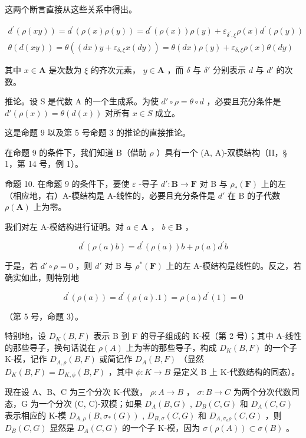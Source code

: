 这两个断言直接从这些关系中得出。

\[
\begin{array}{l} d ^ {\prime} (\rho (x y)) = d ^ {\prime} (\rho (x) \rho (y)) = d ^ {\prime} (\rho (x)) \rho (y) + \varepsilon_ {\delta ^ {\prime}, \xi} \rho (x) d ^ {\prime} (\rho (y)) \\ \theta (d (x y)) = \theta ((d x) y + \varepsilon_ {\delta, \xi} x (d y)) = \theta (d x) \rho (y) + \varepsilon_ {\delta, \xi} \rho (x) \theta (d y) \end{array}
\]

其中 \(x \in \mathbf{A}\) 是次数为 \(\xi\) 的齐次元素， \(y \in \mathbf{A}\) ，而 \(\delta\) 与 \(\delta'\) 分别表示 \(d\) 与 \(d'\) 的次数。

推论。设 S 是代数 A 的一个生成系。为使 \(d' \circ \rho = \theta \circ d\) ，必要且充分条件是 \(d'(\rho(x)) = \theta(d(x))\) 对所有 \(x \in S\) 成立。

这是命题 9 以及第 5 号命题 3 的推论的直接推论。

在命题 9 的条件下，我们知道 B（借助 \(\rho\) ）具有一个 (A, A)-双模结构（II，§ 1，第 14 号，例 1）。

命题 10. 在命题 9 的条件下，要使 \(\varepsilon\) -导子 \(d': \mathbf{B} \to \mathbf{F}\) 对 B 与 \(\rho_*(\mathbf{F})\) 上的左（相应地，右）A-模结构是 A-线性的，必要且充分条件是 \(d'\) 在 B 的子代数 \(\rho(\mathbf{A})\) 上为零。

我们对左 A-模结构进行证明。对 \(a \in \mathbf{A}\) ， \(b \in \mathbf{B}\) ，

\[
d ^ {\prime} (\rho (a) b) = d ^ {\prime} (\rho (a)) b + \rho (a) d ^ {\prime} b
\]

于是，若 \(d' \circ \rho = 0\) ，则 \(d'\) 对 B 与 \(\rho^*(\mathbf{F})\) 上的左 A-模结构是线性的。反之，若确实如此，则特别地

\[
d ^ {\prime} (\rho (a)) = d ^ {\prime} (\rho (a). 1) = \rho (a) d ^ {\prime} (1) = 0
\]

（第 5 号，命题 3）。

特别地，设 \(D_{K}(B,F)\) 表示 B 到 F 的导子组成的 K-模（第 2 号）；其中 A-线性的那些导子，换句话说在 \(\rho(A)\) 上为零的那些导子，构成 \(D_{K}(B,F)\) 的一个子 K-模，记作 \(D_{A,\rho}(B,F)\) 或简记作 \(D_{A}(B,F)\) （显然 \(D_{K}(B,F)=D_{K,\phi}(B,F)\) ，其中 \(\phi:K\to B\) 是定义 B 上 K-代数结构的同态）。

现在设 A、B、C 为三个分次 K-代数， \(\rho:A\to B\) ， \(\sigma:B\to C\) 为两个分次代数同态，G 为一个分次 (C, C)-双模；如果 \(D_{A}(B,G)\) , \(D_{B}(C,G)\) 和 \(D_{A}(C,G)\) 表示相应的 K-模 \(D_{A,\rho}(B,\sigma_{*}(G))\) , \(D_{B,\sigma}(C,G)\) 和 \(D_{A,\sigma_{o}\rho}(C,G)\) ，则 \(D_{B}(C,G)\) 显然是 \(D_{A}(C,G)\) 的一个子 K-模，因为 \(\sigma(\rho(A))\subset\sigma(B)\) 。

